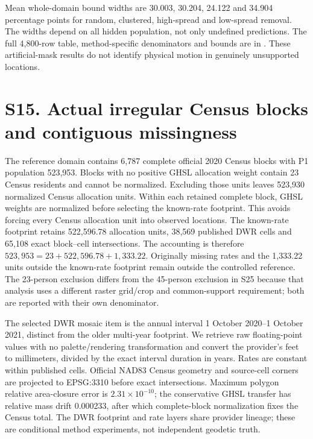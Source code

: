 \documentclass[10pt,a4paper]{article}
\begin{document}
Mean whole-domain bound widths are 30.003, 30.204, 24.122 and 34.904 percentage points for random, clustered, high-spread and low-spread removal. The widths depend on all hidden population, not only undefined predictions. The full 4,800-row table, method-specific denominators and bounds are in . These artificial-mask results do not identify physical motion in genuinely unsupported locations.



\section*{S15. Actual irregular Census blocks and contiguous missingness}
The reference domain contains 6,787 complete official 2020 Census blocks with P1 population 523,953. Blocks with no positive GHSL allocation weight contain 23 Census residents and cannot be normalized. Excluding those units leaves 523,930 normalized Census allocation units. Within each retained complete block, GHSL weights are normalized before selecting the known-rate footprint. This avoids forcing every Census allocation unit into observed locations. The known-rate footprint retains 522,596.78 allocation units, 38,569 published DWR cells and 65,108 exact block--cell intersections. The accounting is therefore $523{,}953=23+522{,}596.78+1{,}333.22$. Originally missing rates and the 1,333.22 units outside the known-rate footprint remain outside the controlled reference. The 23-person exclusion differs from the 45-person exclusion in S25 because that analysis uses a different raster grid/crop and common-support requirement; both are reported with their own denominator.

The selected DWR mosaic item is the annual interval 1 October 2020--1 October 2021, distinct from the older multi-year footprint. We retrieve raw floating-point values with no palette/rendering transformation and convert the provider's feet to millimeters, divided by the exact interval duration in years. Rates are constant within published cells. Official NAD83 Census geometry and source-cell corners are projected to EPSG:3310 before exact intersections. Maximum polygon relative area-closure error is $2.31\times10^{-10}$; the conservative GHSL transfer has relative mass drift 0.000233, after which complete-block normalization fixes the Census total. The DWR footprint and rate layers share provider lineage; these are conditional method experiments, not independent geodetic truth.
\end{document}
